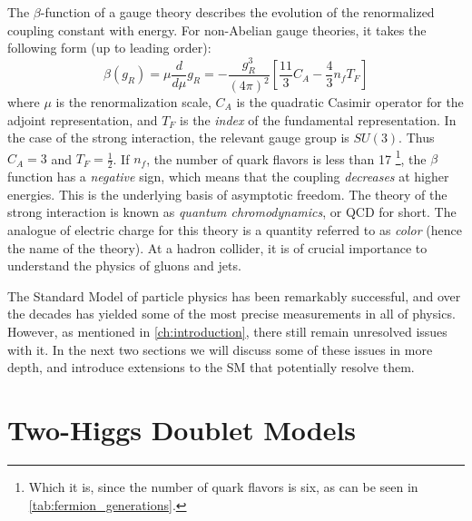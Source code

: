 The $\beta$-function of a gauge theory describes the evolution of the renormalized coupling constant with energy. For non-Abelian gauge theories, it takes the following form (up to leading order):%
\begin{equation}
  \beta(g_R) = \mu\frac{d}{d\mu}g_R = -\frac{g_R^3}{(4\pi)^2}\left[\frac{11}{3}C_A -\frac{4}{3}n_fT_F\right]
\end{equation}
where $\mu$ is the renormalization scale, $C_A$ is the quadratic Casimir operator for the adjoint representation, and $T_F$ is the \emph{index} of the fundamental representation.
In the case of the strong interaction, the relevant gauge group is $SU(3)$. Thus $C_A = 3$ and $T_F = \frac{1}{2}$. If $n_f$, the number of quark flavors is less than 17 \footnote{Which it is, since the number of quark flavors is six, as can be seen in \autoref{tab:fermion_generations}.}, the $\beta$ function has a \emph{negative} sign, which means that the coupling \emph{decreases} at higher energies. This is the underlying basis of asymptotic freedom. The theory of the strong interaction is known as \emph{quantum chromodynamics}, or QCD for short. The analogue of electric charge for this theory is a quantity referred to as \emph{color} (hence the name of the theory). At a hadron collider, it is of crucial importance to understand the physics of gluons and jets.

The Standard Model of particle physics has been remarkably successful, and over the decades has yielded some of the most precise measurements in all of physics. However, as mentioned in \autoref{ch:introduction}, there still remain unresolved issues with it. In the next two sections we will discuss some of these issues in more depth, and introduce extensions to the SM that potentially resolve them.

\section{Two-Higgs Doublet Models}\label{sec:2HDMs}

